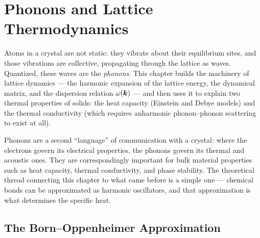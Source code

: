 \chapter{Phonons and Lattice Thermodynamics}
\label{ch:phonons}

Atoms in a crystal are not static: they vibrate about their equilibrium sites, and those vibrations are collective, propagating through the lattice as waves. Quantized, these waves are the \emph{phonons}. This chapter builds the machinery of lattice dynamics --- the harmonic expansion of the lattice energy, the dynamical matrix, and the dispersion relation $\omega(\bm{k})$ --- and then uses it to explain two thermal properties of solids: the heat capacity (Einstein and Debye models) and the thermal conductivity (which requires anharmonic phonon--phonon scattering to exist at all).

Phonons are a second ``language'' of communication with a crystal: where the electrons govern its electrical properties, the phonons govern its thermal and acoustic ones. They are correspondingly important for bulk material properties such as heat capacity, thermal conductivity, and phase stability. The theoretical thread connecting this chapter to what came before is a simple one --- chemical bonds can be approximated as harmonic oscillators, and that approximation is what determines the specific heat.

\section{The Born--Oppenheimer Approximation}

